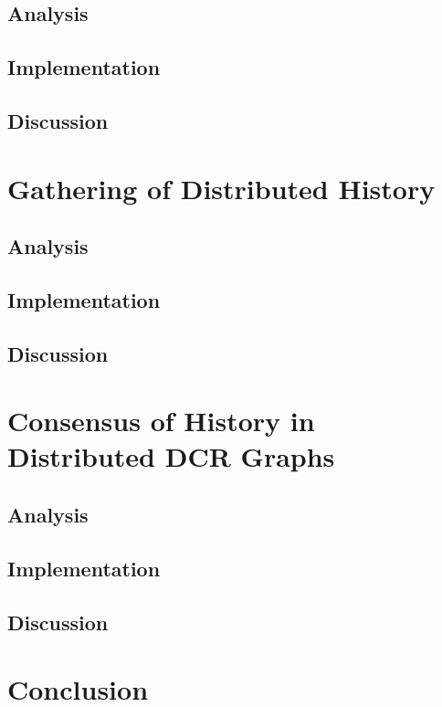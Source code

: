 \documentclass[fullpage]{report}
\begin{document}
		\section{Analysis} %
		\section{Implementation} %
		\section{Discussion} %
	\chapter{Gathering of Distributed History}
		\section{Analysis} %
		\section{Implementation} %
		\section{Discussion} %
	\chapter{Consensus of History in Distributed DCR Graphs}
		\section{Analysis} %
		\section{Implementation} %
		\section{Discussion} %
	\chapter{Conclusion}
\end{document}
